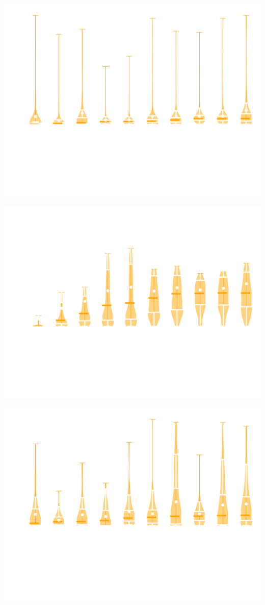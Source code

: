 \documentclass{beamer}
\begin{document}
\begin{frame}
    \begin{center}
        \includegraphics[width=.8\textwidth]{static/performances_noisy.png}
    \end{center}
\end{frame}

\begin{frame}
    \begin{center}
        \includegraphics[width=.8\textwidth]{static/performances_probabilistic_ending.png}
    \end{center}
\end{frame}

\begin{frame}
    \begin{center}
        \includegraphics[width=.8\textwidth]{static/performances_noisy_probabilistic_ending.png}
    \end{center}
\end{frame}
\end{document}
